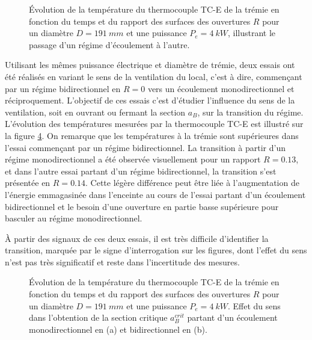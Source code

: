 \begin{figure}
\centering
\resizebox{0.75\textwidth}{!}{}
\caption{Évolution de la température du thermocouple TC-E de la trémie en fonction du temps et du rapport des surfaces des ouvertures $R$ pour un diamètre $D=\SI{191}{mm}$ et une puissance $P_e=\SI{4}{kW}$, illustrant le passage d'un régime d'écoulement à l'autre.}
\label{fig:tc_est_2R_trans}
\end{figure}

Utilisant les mêmes puissance électrique et diamètre de trémie, deux essais ont été réalisés en variant le sens de la ventilation du local, c'est à dire, commençant par un régime bidirectionnel en $R=0$ vers un écoulement monodirectionnel et réciproquement. L'objectif de ces essais c'est d'étudier l'influence du sens de la ventilation, soit en ouvrant ou fermant la section $a_B$, sur la transition du régime. L'évolution des températures mesurées par la thermocouple TC-E est illustré sur la figure \ref{fig:tc_est_2R_hyst}. On remarque que les températures à la trémie sont supérieures dans l'essai commençant par un régime bidirectionnel. La transition à partir d'un régime monodirectionnel a été observée visuellement pour un rapport $R= 0.13$, et dans l'autre essai partant d'un régime bidirectionnel, la transition s'est présentée en $R=0.14$. Cette légère différence peut être liée à l'augmentation de l'énergie emmagasinée dans l'enceinte au cours de l'essai partant d'un écoulement bidirectionnel et le besoin d'une ouverture en partie basse supérieure pour basculer au régime monodirectionnel.

À partir des signaux de ces deux essais, il est très difficile d'identifier la transition, marquée par le signe d'interrogation sur les figures, dont l'effet du sens n'est pas très significatif et reste dans l'incertitude des mesures.

\begin{figure}
\centering
\begin{subfigure}[t]{0.485\textwidth}
  \centering
  \resizebox{\textwidth}{!}{}
  \caption{}
  \label{fig:hyst_mono}
\end{subfigure}
\begin{subfigure}[t]{0.485\textwidth}
  \centering
  \resizebox{\textwidth}{!}{}
  \caption{}
  \label{fig:hyst_mono}
\end{subfigure}
\caption{Évolution de la température du thermocouple TC-E de la trémie en fonction du temps et du rapport des surfaces des ouvertures $R$ pour un diamètre ${D=\SI{191}{mm}}$ et une puissance $P_e=\SI{4}{kW}$. Effet du sens dans l'obtention de la section critique $a^{crit}_B$ partant d'un écoulement monodirectionnel en (a) et bidirectionnel en (b).}
\label{fig:tc_est_2R_hyst}
\end{figure}

